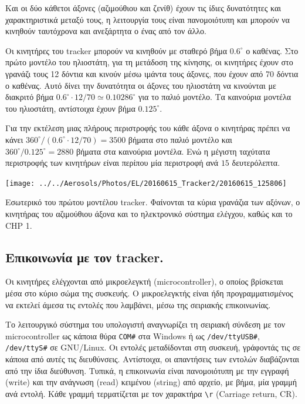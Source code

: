\documentclass[
  a4paper,
  twoside,
  titlepage,
  12pt]{article}
\numberwithin{equation}{section}
\numberwithin{figure}{section}
\numberwithin{table}{section}
\begin{document}
Και οι δύο κάθετοι άξονες (αζιμούθιου και ζενίθ) έχουν τις ίδιες δυνατότητες και χαρακτηριστικά μεταξύ τους, η λειτουργία τους είναι πανομοιότυπη και μπορούν να κινηθούν ταυτόχρονα και ανεξάρτητα ο ένας από τον άλλο.

Οι κινητήρες του tracker μπορούν να κινηθούν με σταθερό βήμα \(0.6^\circ\) ο καθένας.
Στο πρώτο μοντέλο του ηλιοστάτη, για τη μετάδοση της κίνησης, οι κινητήρες έχουν στο γρανάζι τους 12 δόντια και κινούν μέσω ιμάντα τους άξονες, που έχουν από 70 δόντια ο καθένας.
Αυτό δίνει την δυνατότητα οι άξονες του ηλιοστάτη να κινούνται με διακριτό βήμα \(0.6^\circ \cdot 12 / 70 \simeq 0.10286^\circ\) για το παλιό μοντέλο. Τα καινούρια μοντέλα του ηλιοστάτη, αντίστοιχα έχουν βήμα \({0.125}^\circ\).

Για την εκτέλεση μιας πλήρους περιστροφής του κάθε άξονα ο κινητήρας πρέπει να κάνει \(360^\circ / (0.6^\circ \cdot 12 / 70) = 3500\) βήματα στο παλιό μοντέλο και \(360^\circ / {0.125}^\circ = 2880\) βήματα στα καινούρια μοντέλα.
Ενώ η μέγιστη ταχύτατα περιστροφής των κινητήρων είναι περίπου μία περιστροφή ανά \(15\) δευτερόλεπτα.

\begin{img}

{\centering \texttt{[image: ../../Aerosols/Photos/EL/20160615\_Tracker2/20160615\_125806]} 

}

\caption{Εσωτερικό του πρώτου μοντέλου tracker. Φαίνονται τα κύρια γρανάζια των αξόνων, ο κινητήρας του αζιμούθιου άξονα και το ηλεκτρονικό σύστημα ελέγχου, καθώς και το CHP 1.}\label{fig:trackerinside}
\end{img}

\hypertarget{tracker_communication}{%
\subsection{Επικοινωνία με τον tracker.}\label{tracker_communication}}

Οι κινητήρες ελέγχονται από μικροελεγκτή (microcontroller), ο οποίος βρίσκεται μέσα στο κύριο σώμα της συσκευής. Ο μικροελεγκτής είναι ήδη προγραμματισμένος να εκτελεί άμεσα τις εντολές που λαμβάνει, μέσω της σειριακής επικοινωνίας.

Το λειτουργικό σύστημα του υπολογιστή αναγνωρίζει τη σειριακή σύνδεση με τον microcontroller ως κάποια θύρα \texttt{COM\#} στα Windows ή ως \texttt{/dev/ttyUSB\#}, \texttt{/dev/ttyS\#} σε GNU/Linux. Οι εντολές μεταδίδονται στη συσκευή, γράφοντάς τις σε κάποια από αυτές τις διευθύνσεις. Αντίστοιχα, οι απαντήσεις των εντολών διαβάζονται από την ίδια διεύθυνση. Τυπικά, η επικοινωνία είναι πανομοιότυπη με την εγγραφή (write) και την ανάγνωση (read) κειμένου (string) από αρχείο, με βήμα, μία γραμμή ανά εντολή. Κάθε γραμμή τερματίζεται με τον χαρακτήρα \texttt{\textquotesingle{}\textbackslash{}r\textquotesingle{}} (Carriage return, CR).
\end{document}
